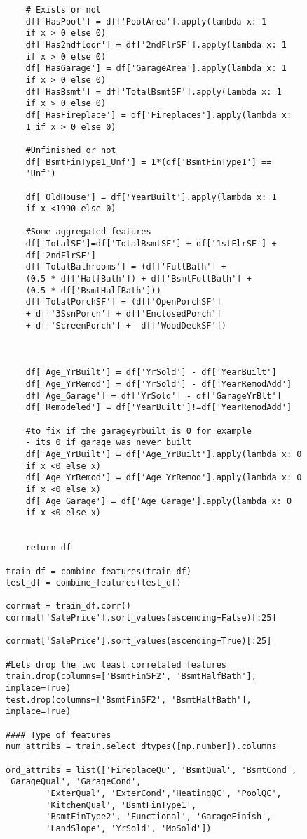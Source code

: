 \documentclass[12pt]{article}%
\begin{document}
\begin{lstlisting}
    # Exists or not
    df['HasPool'] = df['PoolArea'].apply(lambda x: 1 
    if x > 0 else 0)
    df['Has2ndfloor'] = df['2ndFlrSF'].apply(lambda x: 1
    if x > 0 else 0)
    df['HasGarage'] = df['GarageArea'].apply(lambda x: 1 
    if x > 0 else 0)
    df['HasBsmt'] = df['TotalBsmtSF'].apply(lambda x: 1
    if x > 0 else 0)
    df['HasFireplace'] = df['Fireplaces'].apply(lambda x:
    1 if x > 0 else 0)
    
    #Unfinished or not
    df['BsmtFinType1_Unf'] = 1*(df['BsmtFinType1'] ==
    'Unf')
    
    df['OldHouse'] = df['YearBuilt'].apply(lambda x: 1 
    if x <1990 else 0)
    
    #Some aggregated features
    df['TotalSF']=df['TotalBsmtSF'] + df['1stFlrSF'] + 
    df['2ndFlrSF']
    df['TotalBathrooms'] = (df['FullBath'] + 
    (0.5 * df['HalfBath']) + df['BsmtFullBath'] + 
    (0.5 * df['BsmtHalfBath']))
    df['TotalPorchSF'] = (df['OpenPorchSF'] 
    + df['3SsnPorch'] + df['EnclosedPorch'] 
    + df['ScreenPorch'] +  df['WoodDeckSF'])
    
    
  
    df['Age_YrBuilt'] = df['YrSold'] - df['YearBuilt']
    df['Age_YrRemod'] = df['YrSold'] - df['YearRemodAdd']
    df['Age_Garage'] = df['YrSold'] - df['GarageYrBlt']
    df['Remodeled'] = df['YearBuilt']!=df['YearRemodAdd']

    #to fix if the garageyrbuilt is 0 for example 
    - its 0 if garage was never built
    df['Age_YrBuilt'] = df['Age_YrBuilt'].apply(lambda x: 0
    if x <0 else x)
    df['Age_YrRemod'] = df['Age_YrRemod'].apply(lambda x: 0 
    if x <0 else x)
    df['Age_Garage'] = df['Age_Garage'].apply(lambda x: 0 
    if x <0 else x)
        
    
    return df

train_df = combine_features(train_df)
test_df = combine_features(test_df)

corrmat = train_df.corr()
corrmat['SalePrice'].sort_values(ascending=False)[:25]

corrmat['SalePrice'].sort_values(ascending=True)[:25]

#Lets drop the two least correlated features
train.drop(columns=['BsmtFinSF2', 'BsmtHalfBath'], 
inplace=True)
test.drop(columns=['BsmtFinSF2', 'BsmtHalfBath'],
inplace=True)

#### Type of features
num_attribs = train.select_dtypes([np.number]).columns

ord_attribs = list(['FireplaceQu', 'BsmtQual', 'BsmtCond',
'GarageQual', 'GarageCond', 
        'ExterQual', 'ExterCond','HeatingQC', 'PoolQC', 
        'KitchenQual', 'BsmtFinType1', 
        'BsmtFinType2', 'Functional', 'GarageFinish',
        'LandSlope', 'YrSold', 'MoSold'])


\end{lstlisting}
\end{document}
